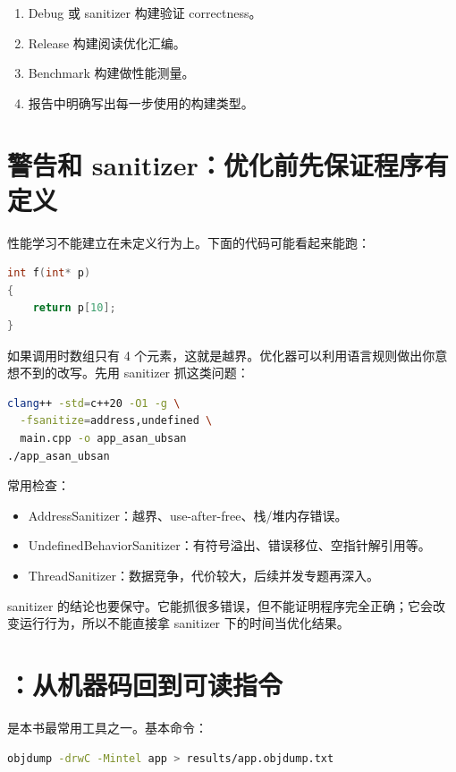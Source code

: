 \begin{enumerate}
  \item Debug 或 sanitizer 构建验证 correctness。
  \item Release 构建阅读优化汇编。
  \item Benchmark 构建做性能测量。
  \item 报告中明确写出每一步使用的构建类型。
\end{enumerate}

\section{警告和 sanitizer：优化前先保证程序有定义}

性能学习不能建立在未定义行为上。下面的代码可能看起来能跑：

\begin{lstlisting}[language=C++]
int f(int* p)
{
    return p[10];
}
\end{lstlisting}

如果调用时数组只有 4 个元素，这就是越界。优化器可以利用语言规则做出你意想不到的改写。先用 sanitizer 抓这类问题：

\begin{lstlisting}[language=bash]
clang++ -std=c++20 -O1 -g \
  -fsanitize=address,undefined \
  main.cpp -o app_asan_ubsan
./app_asan_ubsan
\end{lstlisting}

常用检查：

\begin{itemize}
  \item AddressSanitizer：越界、use-after-free、栈/堆内存错误。
  \item UndefinedBehaviorSanitizer：有符号溢出、错误移位、空指针解引用等。
  \item ThreadSanitizer：数据竞争，代价较大，后续并发专题再深入。
\end{itemize}

sanitizer 的结论也要保守。它能抓很多错误，但不能证明程序完全正确；它会改变运行行为，所以不能直接拿 sanitizer 下的时间当优化结果。

\section{：从机器码回到可读指令}

\code{objdump} 是本书最常用工具之一。基本命令：

\begin{lstlisting}[language=bash]
objdump -drwC -Mintel app > results/app.objdump.txt
\end{lstlisting}

